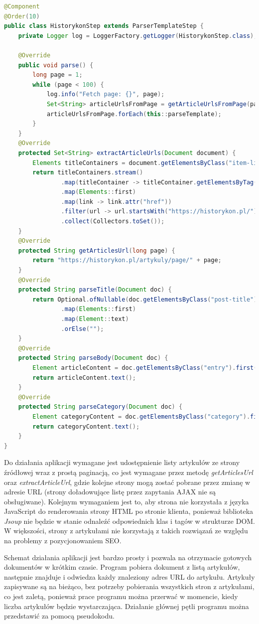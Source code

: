 \begin{lstlisting}[language=Java, basicstyle=\tiny, style=javaStyle]
@Component
@Order(10)
public class HistorykonStep extends ParserTemplateStep {
	private Logger log = LoggerFactory.getLogger(HistorykonStep.class);

	@Override
	public void parse() {
		long page = 1;
		while (page < 100) {
			log.info("Fetch page: {}", page);
			Set<String> articleUrlsFromPage = getArticleUrlsFromPage(page++);
			articleUrlsFromPage.forEach(this::parseTemplate);
		}
	}
	@Override
	protected Set<String> extractArticleUrls(Document document) {
		Elements titleContainers = document.getElementsByClass("item-list");
		return titleContainers.stream()
				.map(titleContainer -> titleContainer.getElementsByTag("a"))
				.map(Elements::first)
				.map(link -> link.attr("href"))
				.filter(url -> url.startsWith("https://historykon.pl/"))
				.collect(Collectors.toSet());
	}
	@Override
	protected String getArticlesUrl(long page) {
		return "https://historykon.pl/artykuly/page/" + page;
	}
	@Override
	protected String parseTitle(Document doc) {
		return Optional.ofNullable(doc.getElementsByClass("post-title"))
				.map(Elements::first)
				.map(Element::text)
				.orElse("");
	}
	@Override
	protected String parseBody(Document doc) {
		Element articleContent = doc.getElementsByClass("entry").first();
		return articleContent.text();
	}
	@Override
	protected String parseCategory(Document doc) {
		Element categoryContent = doc.getElementsByClass("category").first();
		return categoryContent.text();
	}
}
\end{lstlisting}

Do działania aplikacji wymagane jest udostępnienie listy artykułów ze strony źródłowej wraz z prostą paginacją, co jest wymagane przez metodę \textit{getArticlesUrl} oraz \textit{extractArticleUrl}, gdzie kolejne strony mogą zostać pobrane przez zmianę w adresie URL (strony doładowujące listę przez zapytania AJAX nie są obsługiwane). Kolejnym wymaganiem jest to, aby strona nie korzystała z języka JavaScript do renderowania strony HTML po stronie klienta, ponieważ biblioteka \textit{Jsoup} nie będzie w stanie odnaleźć odpowiednich klas i tagów w strukturze DOM. W większości, strony z artykułami nie korzystają z takich rozwiązań ze względu na problemy z pozycjonowaniem SEO.

Schemat działania aplikacji jest bardzo prosty i pozwala na otrzymacie gotowych dokumentów w krótkim czasie.
Program pobiera dokument z listą artykułów, następnie znajduje i odwiedza każdy znaleziony adres URL do artykułu. Artykuły zapisywane są na bieżąco, bez potrzeby pobierania wszystkich stron z artykułami, co jest zaletą, ponieważ prace programu można przerwać w momencie, kiedy liczba artykułów będzie wystarczająca. Działanie głównej pętli programu można przedstawić za pomocą pseudokodu.

